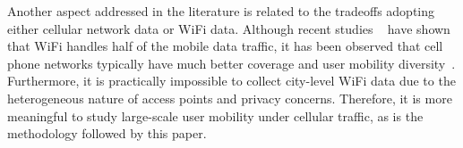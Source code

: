 Another aspect addressed in the literature is related to the tradeoffs adopting either cellular network data or WiFi data. Although recent studies ~\cite{lee2010mobile,baumann2014availability} have shown that WiFi handles half of the mobile data traffic, it has been observed that cell phone networks typically have much better coverage and user mobility diversity~\cite{wagner2014device, yadav2014characterizing}. Furthermore, it is practically impossible to collect city-level WiFi data due to the heterogeneous nature of access points and privacy concerns. Therefore, it is more meaningful to study large-scale user mobility under cellular traffic, as is the methodology followed by this paper.
